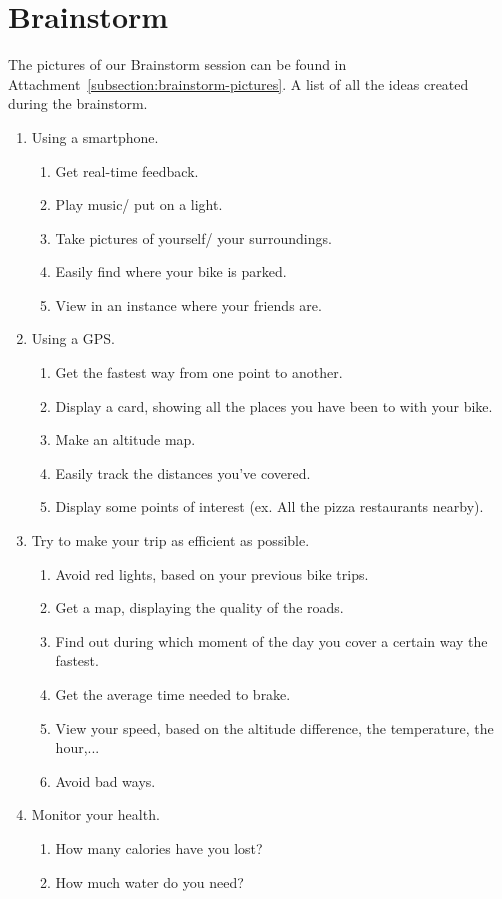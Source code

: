\section{Brainstorm}
The pictures of our Brainstorm session can be found in Attachment~\ref{subsection:brainstorm-pictures}.
A list of all the ideas created during the brainstorm.
\begin{enumerate}
 \item Using a smartphone.
 \begin{enumerate}
 \item Get real-time feedback.
 \item Play music/ put on a light.
 \item Take pictures of yourself/ your surroundings.
 \item Easily find where your bike is parked.
 \item View in an instance where your friends are.
 \end{enumerate}
 \item Using a GPS.
  \begin{enumerate}
  \item Get the fastest way from one point to another.
  \item Display a card, showing all the places you have been to with your bike. 
  \item Make an altitude map.
  \item Easily track the distances you've covered.
  \item Display some points of interest (ex. All the pizza restaurants nearby).
  \end{enumerate}
  \item Try to make your trip as efficient as possible.
  \begin{enumerate}
  \item Avoid red lights, based on your previous bike trips.
  \item Get a map, displaying the quality of the roads.
  \item Find out during which moment of the day you cover a certain way the fastest.
  \item Get the average time needed to brake.
  \item View your speed, based on the altitude difference, the temperature, the hour,...
  \item Avoid bad ways.
  \end{enumerate}
  \item Monitor your health.
  \begin{enumerate}
   \item How many calories have you lost?
    \item How much water do you need?
  \end{enumerate}
\end{enumerate}


